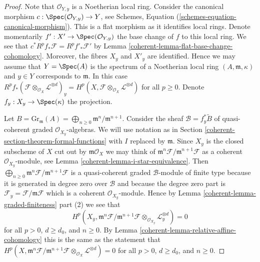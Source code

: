 \begin{proof}

Note that $\mathcal{O}_{Y, y}$ is a Noetherian local ring.
Consider the canonical morphism
$c : \Spec(\mathcal{O}_{Y, y}) \to Y$, see
Schemes, Equation (\ref{schemes-equation-canonical-morphism}).
This is a flat morphism as it identifies local rings.
Denote momentarily $f' : X' \to \Spec(\mathcal{O}_{Y, y})$
the base change of $f$ to this local ring. We see that
$c^*R^pf_*\mathcal{F} = R^pf'_*\mathcal{F}'$ by
Lemma \ref{coherent-lemma-flat-base-change-cohomology}.
Moreover, the fibres $X_y$ and $X'_y$ are identified.
Hence we may assume that $Y = \Spec(A)$ is the spectrum of
a Noetherian local ring $(A, \mathfrak m, \kappa)$ and $y \in Y$
corresponds to $\mathfrak m$. In this case
$R^pf_*(\mathcal{F} \otimes_{\mathcal{O}_X} \mathcal{L}^{\otimes d})_y =
H^p(X, \mathcal{F} \otimes_{\mathcal{O}_X} \mathcal{L}^{\otimes d})$
for all $p \geq 0$. Denote $f_y : X_y \to \Spec(\kappa)$ the projection.

\medskip\noindent
Let $B = \text{Gr}_\mathfrak m(A) =
\bigoplus_{n \geq 0} \mathfrak m^n/\mathfrak m^{n + 1}$.
Consider the sheaf $\mathcal{B} = f_y^*\widetilde{B}$
of quasi-coherent graded $\mathcal{O}_{X_y}$-algebras.
We will use notation as in Section \ref{coherent-section-theorem-formal-functions}
with $I$ replaced by $\mathfrak m$.
Since $X_y$ is the closed subscheme of $X$ cut out by
$\mathfrak m\mathcal{O}_X$ we may think of
$\mathfrak m^n\mathcal{F}/\mathfrak m^{n + 1}\mathcal{F}$
as a coherent $\mathcal{O}_{X_y}$-module, see
Lemma \ref{coherent-lemma-i-star-equivalence}. Then
$\bigoplus_{n \geq 0} \mathfrak m^n\mathcal{F}/\mathfrak m^{n + 1}\mathcal{F}$
is a quasi-coherent graded $\mathcal{B}$-module of finite type
because it is generated in degree zero over $\mathcal{B}$
and because the degree zero part is
$\mathcal{F}_y = \mathcal{F}/\mathfrak m \mathcal{F}$
which is a coherent $\mathcal{O}_{X_y}$-module.
Hence by Lemma \ref{coherent-lemma-graded-finiteness} part (2)
we see that
$$
H^p(X_y, \mathfrak m^n \mathcal{F}/ \mathfrak m^{n + 1}\mathcal{F}
\otimes_{\mathcal{O}_{X_y}} \mathcal{L}_y^{\otimes d}) = 0
$$
for all $p > 0$, $d \geq d_0$, and $n \geq 0$. By
Lemma \ref{coherent-lemma-relative-affine-cohomology}
this is the same as the statement that
$
H^p(X, \mathfrak m^n \mathcal{F}/ \mathfrak m^{n + 1}\mathcal{F}
\otimes_{\mathcal{O}_X} \mathcal{L}^{\otimes d}) = 0
$
for all $p > 0$, $d \geq d_0$, and $n \geq 0$.


\end{proof}
